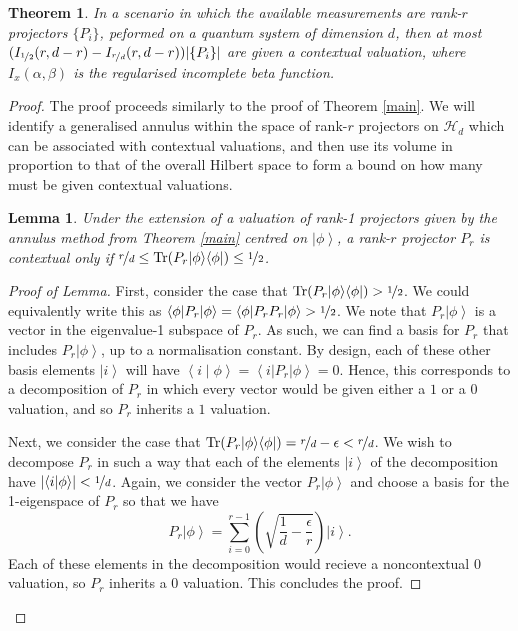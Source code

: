 \documentclass{amsart}
\newtheorem{thm}{Theorem}
\newtheorem{lem}{Lemma}
\theoremstyle{definition}
\DeclareMathOperator{\tr}{Tr}
\newcommand{\ket}[1]{{\left\vert{#1}\right\rangle}}
\newcommand{\bra}[1]{{\left\langle{#1}\right\vert}}
\newcommand{\braket}[2]{{\left< {#1} \middle\vert {#2}\right>}}
\newcommand{\ketbra}[1]{{\left\vert {#1}\middle\rangle\middle\langle{#1}\right\vert}}
\newcommand{\sprod}[2]{\left|\left< {#1} \middle| {#2} \right>\right|}
\begin{document}
\begin{thm}
In a scenario in which the available measurements are rank-$r$ projectors $\{P_i\}$, peformed on a quantum system of dimension $d$, then at most $(I_{\nicefrac{1}{2}}(r,d-r)-I_{\nicefrac{r}{d}}(r,d-r))|\{P_i\}|$ are given a contextual valuation, where $I_x(\alpha,\beta)$ is the \emph{regularised incomplete beta function}.
\end{thm}
\begin{proof}
The proof proceeds similarly to the proof of Theorem \ref{main}. We will identify a generalised annulus within the space of rank-$r$ projectors on $\mathcal{H}_d$ which can be associated with contextual valuations, and then use its volume in proportion to that of the overall Hilbert space to form a bound on how many must be given contextual valuations.
\begin{lem}
Under the extension of a valuation of rank-1 projectors given by the annulus method from Theorem \ref{main} centred on $\ket{\phi}$, a rank-$r$ projector $P_r$ is contextual only if $\nicefrac{r}{d}\leq \tr(P_r\ketbra{\phi})\leq\nicefrac12$.
\end{lem}%
\begin{proof}[Proof of Lemma]

First, consider the case that $\tr(P_r\ketbra{\phi})>\nicefrac12$. We could equivalently write this as $\bra{\phi}P_r\ket\phi=\bra{\phi}P_rP_r\ket\phi>\nicefrac12$. We note that $P_r\ket\phi$ is a vector in the  eigenvalue-1 subspace of $P_r$. As such, we can find a basis for $P_r$ that includes $P_r\ket\phi$, up to a normalisation constant. By design, each of these other basis elements $\ket{i}$ will have $\braket{i}{\phi}=\bra{i}P_r\ket{\phi}=0$. Hence, this corresponds to a decomposition of $P_r$ in which every vector would be given either a $1$ or a $0$ valuation, and so $P_r$ inherits a $1$ valuation.

Next, we consider the case that $\tr(P_r\ketbra{\phi})=\nicefrac{r}{d}-\epsilon<\nicefrac{r}{d}$. We wish to decompose $P_r$ in such a way that each of the elements $\ket{i}$ of the decomposition have $\sprod{i}{\phi}<\nicefrac1d$. Again, we consider the vector $P_r\ket\phi$ and choose a basis for the 1-eigenspace of $P_r$ so that we have
\begin{equation}
P_r\ket\phi=\sum_{i=0}^{r-1}\left(\sqrt{\frac1d-\frac{\epsilon}{r}}\right)\ket{i}.
\end{equation}
Each of these elements in the decomposition would recieve a noncontextual 0 valuation, so $P_r$ inherits a 0 valuation. This concludes the proof.
\end{proof}


\end{proof}
\end{document}
